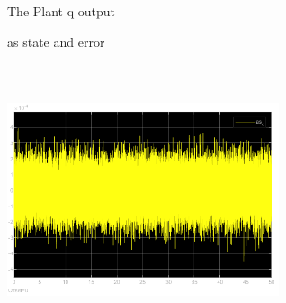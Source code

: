 \documentclass[12pt, a4paper]{article}
\begin{document}
\begin{enumerate}[1.]
\begin{figure}[H]
    \caption{The Plant q output}
    \label{fig:label}
    \end{figure}
    \begin{figure}[H]
        \centering
        \qquad
        \caption{as state and error}
        \label{fig:example}%
    \end{figure}
\begin{figure}[H]
    \centering
    \includegraphics[width=8cm,height=8cm,scale=0.6]{as_o.png}

\end{figure}
\end{enumerate}
\end{document}
